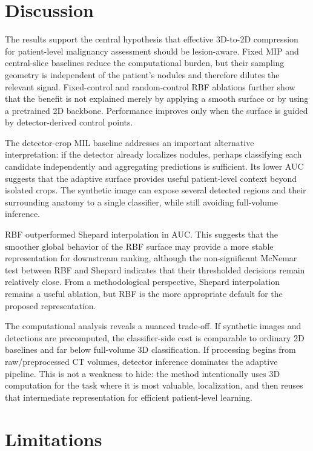\documentclass[preprint,12pt]{elsarticle}
\begin{document}
\section{Discussion}

The results support the central hypothesis that effective 3D-to-2D compression for patient-level malignancy assessment should be lesion-aware. Fixed MIP and central-slice baselines reduce the computational burden, but their sampling geometry is independent of the patient's nodules and therefore dilutes the relevant signal. Fixed-control and random-control RBF ablations further show that the benefit is not explained merely by applying a smooth surface or by using a pretrained 2D backbone. Performance improves only when the surface is guided by detector-derived control points.

The detector-crop MIL baseline addresses an important alternative interpretation: if the detector already localizes nodules, perhaps classifying each candidate independently and aggregating predictions is sufficient. Its lower AUC suggests that the adaptive surface provides useful patient-level context beyond isolated crops. The synthetic image can expose several detected regions and their surrounding anatomy to a single classifier, while still avoiding full-volume inference.

RBF outperformed Shepard interpolation in AUC. This suggests that the smoother global behavior of the RBF surface may provide a more stable representation for downstream ranking, although the non-significant McNemar test between RBF and Shepard indicates that their thresholded decisions remain relatively close. From a methodological perspective, Shepard interpolation remains a useful ablation, but RBF is the more appropriate default for the proposed representation.

The computational analysis reveals a nuanced trade-off. If synthetic images and detections are precomputed, the classifier-side cost is comparable to ordinary 2D baselines and far below full-volume 3D classification. If processing begins from raw/preprocessed CT volumes, detector inference dominates the adaptive pipeline. This is not a weakness to hide: the method intentionally uses 3D computation for the task where it is most valuable, localization, and then reuses that intermediate representation for efficient patient-level learning.

\section{Limitations}
\end{document}
